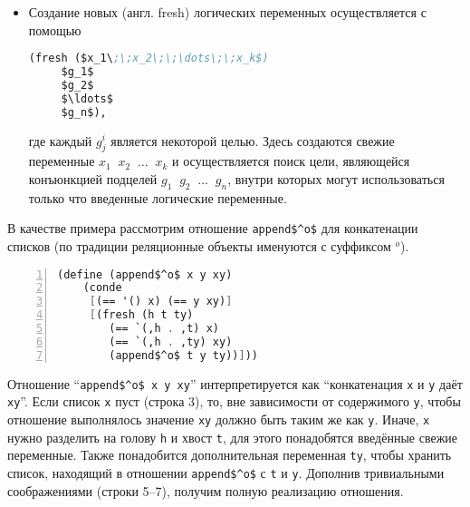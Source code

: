 \begin{itemize}
\item Создание новых (англ. fresh) логических переменных осуществляется с помощью

\begin{lstlisting}[language=scheme]
   (fresh ($x_1\;\;x_2\;\;\dots\;\;x_k$)
     $g_1$
     $g_2$
     $\ldots$
     $g_n$),
\end{lstlisting}

где каждый $g^i_j$ является некоторой целью. Здесь создаются свежие переменные  $x_1\;\;x_2\;\;\dots\;\;x_k$ и
осуществляется поиск цели, являющейся конъюнкцией подцелей $g_1\;\;g_2\;\;\dots\;\;g_n$, внутри которых могут использоваться только что введенные логические переменные.
\end{itemize}

В качестве примера рассмотрим отношение  \lstinline|append$^o$| для конкатенации списков (по традиции реляционные объекты именуются с суффиксом $^o$).

\begin{lstlisting}[mathescape=true,language=scheme,numbers=left,numberstyle=\small,stepnumber=1,numbersep=-5pt]
  (define (append$^o$ x y xy)
    (conde
     [(== '() x) (== y xy)]
     [(fresh (h t ty)
        (== `(,h . ,t) x)
        (== `(,h . ,ty) xy)
        (append$^o$ t y ty))]))
\end{lstlisting}

Отношение \enquote{\lstinline|append$^o$ x y xy|} интерпретируется как \enquote{конкатенация  \lstinline|x| и \lstinline|y| даёт \lstinline|xy|}.
Если список \lstinline|x| пуст (строка 3), то, вне зависимости от содержимого \lstinline|y|, чтобы отношение выполнялось значение \lstinline|xy| должно быть таким же как \lstinline|y|.
Иначе, \lstinline|x| нужно разделить на голову \lstinline|h| и хвост \lstinline|t|, для этого понадобятся введённые свежие переменные.
Также понадобится дополнительная переменная \lstinline|ty|, чтобы хранить список, находящий в отношении \lstinline|append$^o$| с \lstinline|t| и \lstinline|y|.
Дополнив тривиальными соображениями (строки 5--7), получим полную реализацию отношения.


